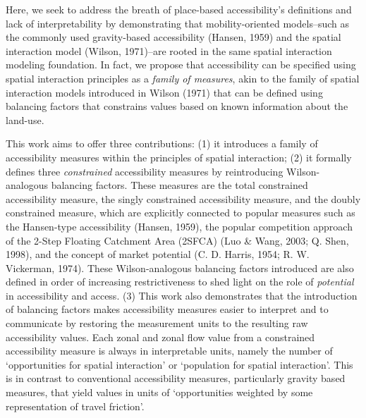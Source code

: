 \documentclass[
11pt, %
oneside, %
english, %
singlespacing, %
]{macthesis} %
\begin{document}
Here, we seek to address the breath of place-based accessibility's definitions and lack of interpretability by demonstrating that mobility-oriented models--such as the commonly used gravity-based accessibility (Hansen, 1959) and the spatial interaction model (Wilson, 1971)--are rooted in the same spatial interaction modeling foundation. In fact, we propose that accessibility can be specified using spatial interaction principles as a \emph{family of measures}, akin to the family of spatial interaction models introduced in Wilson (1971) that can be defined using balancing factors that constrains values based on known information about the land-use.

This work aims to offer three contributions: (1) it introduces a family of accessibility measures within the principles of spatial interaction; (2) it formally defines three \emph{constrained} accessibility measures by reintroducing Wilson-analogous balancing factors. These measures are the total constrained accessibility measure, the singly constrained accessibility measure, and the doubly constrained measure, which are explicitly connected to popular measures such as the Hansen-type accessibility (Hansen, 1959), the popular competition approach of the 2-Step Floating Catchment Area (2SFCA) (Luo \& Wang, 2003; Q. Shen, 1998), and the concept of market potential (C. D. Harris, 1954; R. W. Vickerman, 1974). These Wilson-analogous balancing factors introduced are also defined in order of increasing restrictiveness to shed light on the role of \emph{potential} in accessibility and access. (3) This work also demonstrates that the introduction of balancing factors makes accessibility measures easier to interpret and to communicate by restoring the measurement units to the resulting raw accessibility values. Each zonal and zonal flow value from a constrained accessibility measure is always in interpretable units, namely the number of `opportunities for spatial interaction' or `population for spatial interaction'. This is in contrast to conventional accessibility measures, particularly gravity based measures, that yield values in units of `opportunities weighted by some representation of travel friction'.
\end{document}
